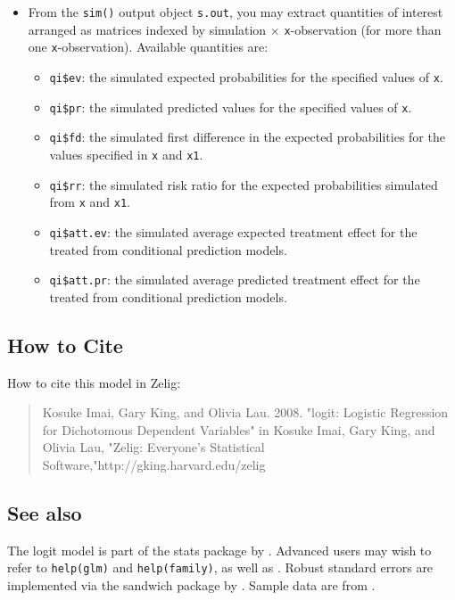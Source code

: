 \documentclass{article}
\begin{document}
\begin{itemize}
\item From the {\tt sim()} output object {\tt s.out}, you may extract
  quantities of interest arranged as matrices indexed by simulation
  $\times$ {\tt x}-observation (for more than one {\tt x}-observation).
  Available quantities are:

   \begin{itemize}
   \item {\tt qi\$ev}: the simulated expected probabilities for the
     specified values of {\tt x}.
   \item {\tt qi\$pr}: the simulated predicted values for the
     specified values of {\tt x}.
   \item {\tt qi\$fd}: the simulated first difference in the expected
     probabilities for the values specified in {\tt x} and {\tt x1}.
   \item {\tt qi\$rr}: the simulated risk ratio for the expected
     probabilities simulated from {\tt x} and {\tt x1}.
   \item {\tt qi\$att.ev}: the simulated average expected treatment
     effect for the treated from conditional prediction models.  
   \item {\tt qi\$att.pr}: the simulated average predicted treatment
     effect for the treated from conditional prediction models.  
   \end{itemize}
\end{itemize}

\subsection* {How to Cite} 

How to cite this model in Zelig:
\begin{verse}
  Kosuke Imai, Gary King, and Olivia Lau. 2008. "logit: Logistic Regression for Dichotomous Dependent Variables" in Kosuke Imai, Gary King, and Olivia Lau, "Zelig: Everyone's Statistical Software,"http://gking.harvard.edu/zelig
\end{verse}


\CiteZelig

\subsection*{See also}

The logit model is part of the stats package by \citet{VenRip02}.
Advanced users may wish to refer to \texttt{help(glm)} and
\texttt{help(family)}, as well as \cite{McCNel89}. Robust standard
errors are implemented via the sandwich package by \citet{Zeileis04}.
Sample data are from \cite{KinTomWit00}.



 
\end{document}
